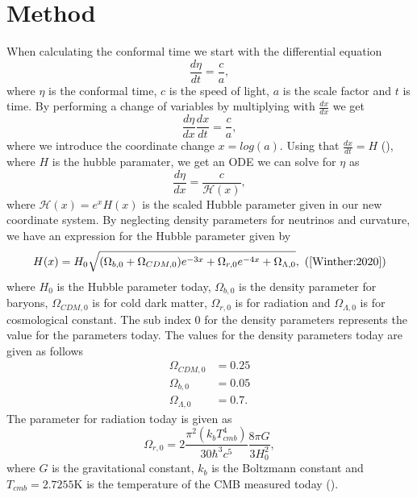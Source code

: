 \documentclass[onecolumn]{aastex62}
\begin{document}
\section{Method} \label{sec:method}
When calculating the conformal time we start with the differential equation
\begin{equation}
    \frac{d\eta}{dt} = \frac{c}{a},
\end{equation}
where $\eta$ is the conformal time, $c$ is the speed of light, $a$ is the scale
factor and $t$ is time. By performing a change of variables by multiplying with
$\frac{dx}{dx}$ we get
\begin{equation}
    \frac{d\eta}{dx}\frac{dx}{dt} = \frac{c}{a},
\end{equation}
where we introduce the coordinate change $x=log(a)$. Using that
$\frac{dx}{dt}=H$ (\cite{callin2006calculate}), where $H$ is the hubble
paramater, we get an ODE we can solve for $\eta$ as
\begin{equation}\label{eq:eta_of_x}
    \frac{d\eta}{dx} = \frac{c}{\mathcal{H}(x)},
\end{equation}
where $\mathcal{H}(x)=e^xH(x)$ is the scaled Hubble parameter given in our new coordinate system. By neglecting density parameters for neutrinos
and curvature, we have an expression for the Hubble parameter given by
\begin{equation}\label{eq:H_of_x}
    H(x) = H_0\sqrt{(\Omega_{b,0} + \Omega_{CDM,0})e^{-3x} + \Omega_{r,0} e^{-4x} + \Omega_{\Lambda,0}}, \text{ (\cite{Winther:2020})}
\end{equation} 
where $H_0$ is the Hubble parameter today, $\Omega_{b,0}$ is the density parameter for baryons,
$\Omega_{CDM,0}$ is for cold dark matter, $\Omega_{r,0}$ is for radiation and
$\Omega_{\Lambda,0}$ is for cosmological constant. The sub index $0$ for the
density parameters represents
the value for the parameters today. The values for the density parameters today
are given as follows
\begin{align}
    \Omega_{CDM,0} &=0.25\\
    \Omega_{b,0} &=0.05\\
    \Omega_{\Lambda,0} &=0.7.
\end{align}
The parameter for radiation today is given as 
\begin{equation}
    \Omega_{r,0} =2\frac{\pi^2(k_bT_{cmb}^4)}{30\hbar^3c^5}\frac{8\pi G}{3H_0^2},
\end{equation}
where $G$ is the gravitational constant, $k_b$ is the Boltzmann constant and
$T_{cmb} =2.7255$K is the temperature of the CMB measured today (\cite{Winther:2020}).
 
\end{document}
